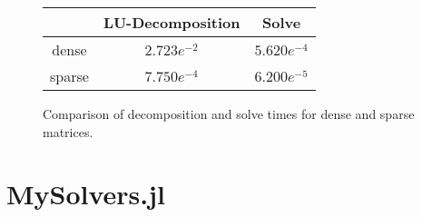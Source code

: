 \documentclass[12pt]{article}
\begin{document}
\begin{flushleft}
\begin{figure}[h!]
\center
\begin{tabular}{||c | c | c ||}
\hline\hline
 & LU-Decomposition & Solve  \\[1ex]\hline
dense & $2.723e^{-2}$ & $5.620e^{-4}$  \\[1ex] \hline
sparse & $7.750e^{-4}$ & $6.200e^{-5}$  \\[1ex] \hline
\end{tabular}
\caption{Comparison of decomposition and solve times for dense and sparse matrices.}
\end{figure}


\end{flushleft}

\pagebreak
\section*{MySolvers.jl}
\end{document}
